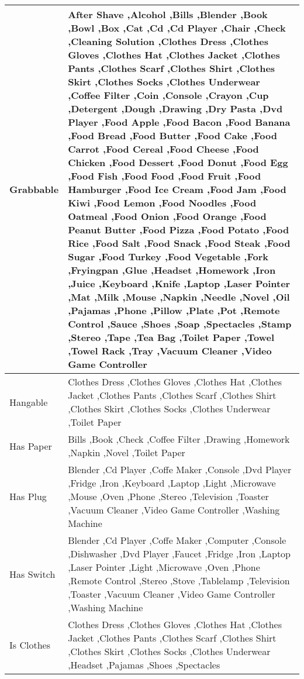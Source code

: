 \begin{longtable}{|p{}|p{}|}
\hline
Grabbable & After Shave  ,Alcohol  ,Bills  ,Blender  ,Book  ,Bowl  ,Box  ,Cat  ,Cd  ,Cd Player  ,Chair  ,Check  ,Cleaning Solution  ,Clothes Dress  ,Clothes Gloves  ,Clothes Hat  ,Clothes Jacket  ,Clothes Pants  ,Clothes Scarf  ,Clothes Shirt  ,Clothes Skirt  ,Clothes Socks  ,Clothes Underwear  ,Coffee Filter  ,Coin  ,Console  ,Crayon  ,Cup  ,Detergent  ,Dough  ,Drawing  ,Dry Pasta  ,Dvd Player  ,Food Apple  ,Food Bacon  ,Food Banana  ,Food Bread  ,Food Butter  ,Food Cake  ,Food Carrot  ,Food Cereal  ,Food Cheese  ,Food Chicken  ,Food Dessert  ,Food Donut  ,Food Egg  ,Food Fish  ,Food Food  ,Food Fruit  ,Food Hamburger  ,Food Ice Cream  ,Food Jam  ,Food Kiwi  ,Food Lemon  ,Food Noodles  ,Food Oatmeal  ,Food Onion  ,Food Orange  ,Food Peanut Butter  ,Food Pizza  ,Food Potato  ,Food Rice  ,Food Salt  ,Food Snack  ,Food Steak  ,Food Sugar  ,Food Turkey  ,Food Vegetable  ,Fork  ,Fryingpan  ,Glue  ,Headset  ,Homework  ,Iron  ,Juice  ,Keyboard  ,Knife  ,Laptop  ,Laser Pointer  ,Mat  ,Milk  ,Mouse  ,Napkin  ,Needle  ,Novel  ,Oil  ,Pajamas  ,Phone  ,Pillow  ,Plate  ,Pot  ,Remote Control  ,Sauce  ,Shoes  ,Soap  ,Spectacles  ,Stamp  ,Stereo  ,Tape  ,Tea Bag  ,Toilet Paper  ,Towel  ,Towel Rack  ,Tray  ,Vacuum Cleaner  ,Video Game Controller  \\
\hline
Hangable & Clothes Dress  ,Clothes Gloves  ,Clothes Hat  ,Clothes Jacket  ,Clothes Pants  ,Clothes Scarf  ,Clothes Shirt  ,Clothes Skirt  ,Clothes Socks  ,Clothes Underwear  ,Toilet Paper  \\
\hline
Has Paper & Bills  ,Book  ,Check  ,Coffee Filter  ,Drawing  ,Homework  ,Napkin  ,Novel  ,Toilet Paper  \\
\hline
Has Plug & Blender  ,Cd Player  ,Coffe Maker  ,Console  ,Dvd Player  ,Fridge  ,Iron  ,Keyboard  ,Laptop  ,Light  ,Microwave  ,Mouse  ,Oven  ,Phone  ,Stereo  ,Television  ,Toaster  ,Vacuum Cleaner  ,Video Game Controller  ,Washing Machine  \\
\hline
Has Switch & Blender  ,Cd Player  ,Coffe Maker  ,Computer  ,Console  ,Dishwasher  ,Dvd Player  ,Faucet  ,Fridge  ,Iron  ,Laptop  ,Laser Pointer  ,Light  ,Microwave  ,Oven  ,Phone  ,Remote Control  ,Stereo  ,Stove  ,Tablelamp  ,Television  ,Toaster  ,Vacuum Cleaner  ,Video Game Controller  ,Washing Machine  \\
\hline
Is Clothes & Clothes Dress  ,Clothes Gloves  ,Clothes Hat  ,Clothes Jacket  ,Clothes Pants  ,Clothes Scarf  ,Clothes Shirt  ,Clothes Skirt  ,Clothes Socks  ,Clothes Underwear  ,Headset  ,Pajamas  ,Shoes  ,Spectacles  \\

\end{longtable}
